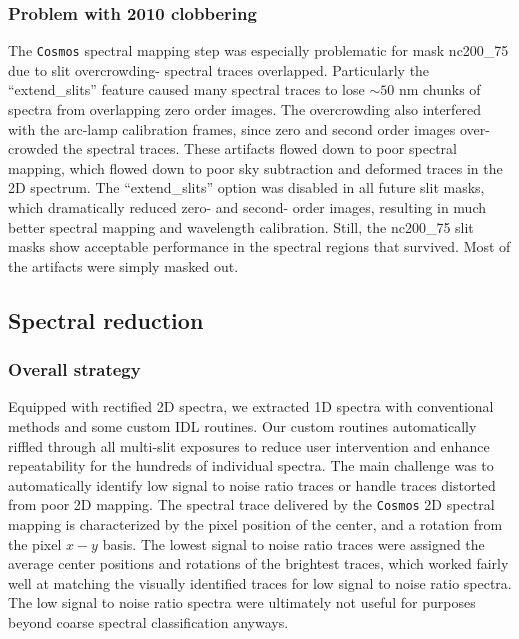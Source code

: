 \documentclass[12pt,preprint]{aastex}
\begin{document}
\subsubsection{Problem with 2010 clobbering}
The \texttt{Cosmos} spectral mapping step was especially problematic for mask nc200\_75 due to slit overcrowding- spectral traces overlapped.  Particularly the ``extend\_slits'' feature caused many spectral traces to lose $\sim50$ nm chunks of spectra from overlapping zero order images.  The overcrowding also interfered with the arc-lamp calibration frames, since zero and second order images over-crowded the spectral traces.  These artifacts flowed down to poor spectral mapping, which flowed down to poor sky subtraction and deformed traces in the 2D spectrum.  The ``extend\_slits'' option was disabled in all future slit masks, which dramatically reduced zero- and second- order images, resulting in much better spectral mapping and wavelength calibration.  Still, the nc200\_75 slit masks show acceptable performance in the spectral regions that survived.  Most of the artifacts were simply masked out.

\subsection{Spectral reduction}

\subsubsection{Overall strategy}
Equipped with rectified 2D spectra, we extracted 1D spectra with conventional methods and some custom IDL routines.  Our custom routines automatically riffled through all multi-slit exposures to reduce user intervention and enhance repeatability for the hundreds of individual spectra.  The main challenge was to automatically identify low signal to noise ratio traces or handle traces distorted from poor 2D mapping.  The spectral trace delivered by the \texttt{Cosmos} 2D spectral mapping is characterized by the pixel position of the center, and a rotation from the pixel $x-y$ basis.  The lowest signal to noise ratio traces were assigned the average center positions and rotations of the brightest traces, which worked fairly well at matching the visually identified traces for low signal to noise ratio spectra.  The low signal to noise ratio spectra were ultimately not useful for purposes beyond coarse spectral classification anyways.
\end{document}
